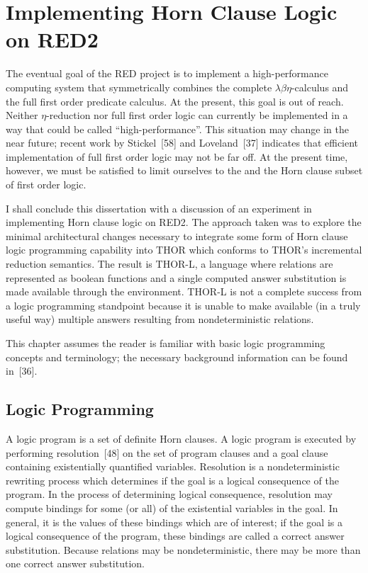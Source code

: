 \chapter{Implementing Horn Clause Logic on RED2}

The eventual goal of the RED project is to implement a high-performance
computing system that symmetrically combines the complete
\(\lambda\beta\eta\)-calculus and the full first order predicate calculus. At
the present, this goal is out of reach. Neither \(\eta\)-reduction nor full
first order logic can currently be implemented in a way that could be called
``high-performance''. This situation may change in the near future; recent work
by Stickel~[58] and Loveland~[37] indicates that efficient implementation of
full first order logic may not be far off. At the present time, however, we
must be satisfied to limit ourselves to the \lambdabetacalculus{} and the Horn
clause subset of first order logic.

I shall conclude this dissertation with a discussion of an experiment in
implementing Horn clause logic on RED2. The approach taken was to explore the
minimal architectural changes necessary to integrate some form of Horn clause
logic programming capability into THOR which conforms to THOR's incremental
reduction semantics. The result is THOR-L, a language where relations are
represented as boolean functions and a single computed answer substitution is
made available through the environment. THOR-L is not a complete success from a
logic programming standpoint because it is unable to make available (in a truly
useful way) multiple answers resulting from nondeterministic relations.

This chapter assumes the reader is familiar with basic logic programming
concepts and terminology; the necessary background information can be found
in~[36].

\section{Logic Programming}

A logic program is a set of definite Horn clauses. A logic program is executed
by performing resolution~[48] on the set of program clauses and a goal clause
containing existentially quantified variables. Resolution is a nondeterministic
rewriting process which determines if the goal is a logical consequence of the
program. In the process of determining logical consequence, resolution may
compute bindings for some (or all) of the existential variables in the goal. In
general, it is the values of these bindings which are of interest; if the goal
is a logical consequence of the program, these bindings are called a correct
answer substitution. Because relations may be nondeterministic, there may be
more than one correct answer substitution.

